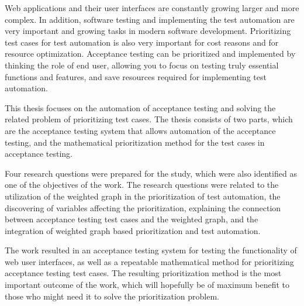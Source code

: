 Web applications and their user interfaces are constantly growing larger and more complex.
In addition, software testing and implementing the test automation are very important and growing tasks in modern software development.
Prioritizing test cases for test automation is also very important for cost reasons and for resource optimization.
Acceptance testing can be prioritized and implemented by thinking the role of end user, allowing you to focus on testing truly essential functions and features, and save resources required for implementing test automation.

This thesis focuses on the automation of acceptance testing and solving the related problem of prioritizing test cases.
The thesis consists of two parts, which are the acceptance testing system that allows automation of the acceptance testing, and the mathematical prioritization method for the test cases in acceptance testing.

Four research questions were prepared for the study, which were also identified as one of the objectives of the work.
The research questions were related to the utilization of the weighted graph in the prioritization of test automation, the discovering of variables affecting the prioritization, explaining the connection between acceptance testing test cases and the weighted graph, and the integration of weighted graph based prioritization and test automation.

The work resulted in an acceptance testing system for testing the functionality of web user interfaces, as well as a repeatable mathematical method for prioritizing acceptance testing test cases.
The resulting prioritization method is the most important outcome of the work, which will hopefully be of maximum benefit to those who might need it to solve the prioritization problem.